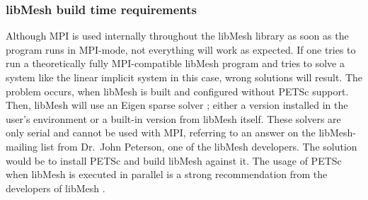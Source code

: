  
  \subsubsection{libMesh build time requirements}\label{sec:Impl-Parallel-Requirements}
   Although MPI is used internally throughout the libMesh library as soon as the program runs in MPI-mode, not everything will work as expected. If one tries to run a theoretically fully MPI-compatible libMesh program and tries to solve a system like the linear implicit system in this case, wrong solutions will result. The problem occurs, when libMesh is built and configured without PETSc support. Then, libMesh will use an Eigen sparse solver \cite{eigen-url}; either a version installed in the user's environment or a built-in version from libMesh itself. These solvers are only serial and cannot be used with MPI, referring to an answer on the libMesh-mailing list from Dr.\ John Peterson, one of the libMesh developers. The solution would be to install PETSc and build libMesh against it. The usage of PETSc when libMesh is executed in parallel is a strong recommendation from the developers of libMesh \cite{libmeshMailList}.
 
 
 
